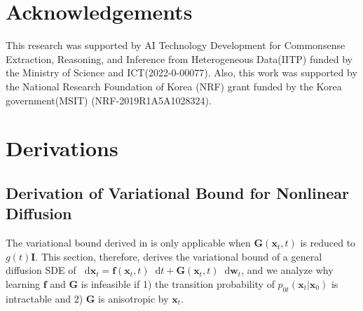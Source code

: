\documentclass{article}
\theoremstyle{definition}
\theoremstyle{remark}
\newcommand*\diff{\mathop{}\!\mathrm{d}}
\begin{document}
	\section*{Acknowledgements}
	This research was supported by AI Technology Development for Commonsense Extraction, Reasoning, and Inference from Heterogeneous Data(IITP) funded by the Ministry of Science and ICT(2022-0-00077). Also, this work was supported by the National Research Foundation of Korea (NRF) grant funded by the Korea government(MSIT) (NRF-2019R1A5A1028324).
	
	
	
	


	


	\newpage
	\appendix
	
	\tableofcontents
	\newpage
	\parttoc
	
	\section{Derivations}\label{appendix:data_diffusion_derivation}
	
	
	
	\subsection{Derivation of Variational Bound for Nonlinear Diffusion}\label{appendix:derivation_of_variational_bound}
	
	The variational bound derived in \citet{song2021maximum} is only applicable when $\mathbf{G}(\mathbf{x}_{t},t)$ is reduced to $g(t)\mathbf{I}$. This section, therefore, derives the variational bound of a general diffusion SDE of $\diff\mathbf{x}_{t}=\mathbf{f}(\mathbf{x}_{t},t)\diff t+\mathbf{G}(\mathbf{x}_{t},t)\diff\mathbf{w}_{t}$, and we analyze why learning $\mathbf{f}$ and $\mathbf{G}$ is infeasible if 1) the transition probability of $p_{0t}(\mathbf{x}_{t}\vert\mathbf{x}_{0})$ is intractable and 2) $\mathbf{G}$ is anisotropic by $\mathbf{x}_{t}$. 
	
\end{document}
